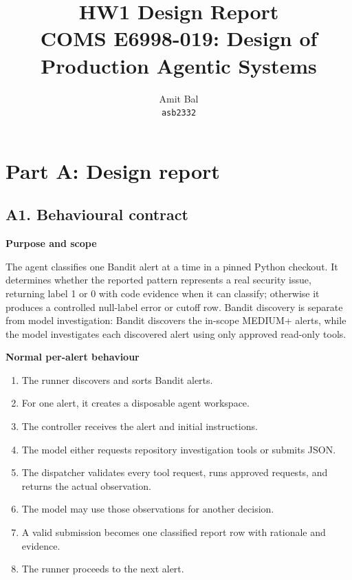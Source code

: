\documentclass[11pt]{article}
\title{HW1 Design Report\\\large COMS E6998-019: Design of Production Agentic Systems}
\author{Amit Bal\\\texttt{asb2332}}
\date{}
\begin{document}
\maketitle

\section*{Part A: Design report}
\subsection*{A1. Behavioural contract}

\noindent\textbf{Purpose and scope}\par\smallskip
The agent classifies one Bandit alert at a time in a pinned Python checkout. It determines whether the reported pattern represents a real security issue, returning label 1 or 0 with code evidence when it can classify; otherwise it produces a controlled null-label error or cutoff row. Bandit discovery is separate from model investigation: Bandit discovers the in-scope MEDIUM+ alerts, while the model investigates each discovered alert using only approved read-only tools.

\vspace{6pt}
\noindent\textbf{Normal per-alert behaviour}\par\smallskip
\begin{enumerate}
  \item The runner discovers and sorts Bandit alerts.
  \item For one alert, it creates a disposable agent workspace.
  \item The controller receives the alert and initial instructions.
  \item The model either requests repository investigation tools or submits JSON.
  \item The dispatcher validates every tool request, runs approved requests, and returns the actual observation.
  \item The model may use those observations for another decision.
  \item A valid submission becomes one classified report row with rationale and evidence.
  \item The runner proceeds to the next alert.
\end{enumerate}
\end{document}
